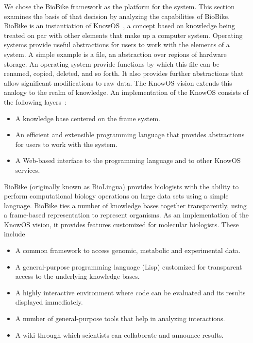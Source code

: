 We chose the BioBike framework as the platform for the system. This
section examines the basis of that decision by analyzing the
capabilities of BioBike.  BioBike is an instantiation of
KnowOS~\cite{oai:CiteSeerXPSU:10.1.1.75.7132}, a concept based on
knowledge being treated on par with other elements that make up a
computer system.  Operating systems provide useful abstractions for
users to work with the elements of a system.  A simple example is a
file, an abstraction over regions of hardware storage.  An operating
system provide functions by which this file can be renamed, copied,
deleted, and so forth. It also provides further abstractions that
allow significant modifications to raw data. The KnowOS vision extends
this analogy to the realm of knowledge. An implementation of the
KnowOS consists of the following
layers~\cite{oai:CiteSeerXPSU:10.1.1.75.7132}:


\begin{itemize}
\item A knowledge base centered on the frame system.
\item An efficient and extensible programming language that provides
  abstractions for users to work with the system.
\item A Web-based interface to the programming language and to other
  KnowOS services.
\end{itemize}

BioBike (originally known as BioLingua) provides biologists with the
ability to perform computational biology operations on large data sets
using a simple language. BioBike ties a number of knowledge bases
together transparently, using a frame-based representation to
represent organisms. As an implementation of the KnowOS vision, it
provides features customized for molecular biologists. These
include~\cite{journals/bioinformatics/MassarTES05}

\begin{itemize}
\item A common framework to access genomic, metabolic and experimental data.
\item A general-purpose programming language (Lisp) customized for
  transparent access to the underlying knowledge bases.
\item A highly interactive environment where code can be evaluated and
  its results displayed immediately.
\item A number of general-purpose tools that help in analyzing interactions.
\item A wiki through which scientists can collaborate and announce results.
\end{itemize}

